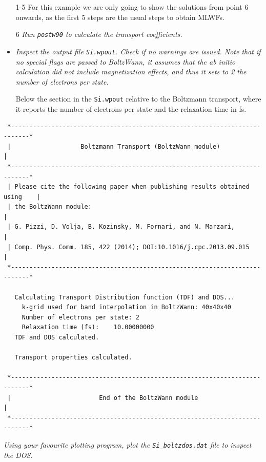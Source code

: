 \begin{itemize}
	\item[1-5] For this example we are only going to show the solutions from point 6 onwards, as the first 5 steps are the usual steps to obtain MLWFs.
	\item[6] {\it Run {\tt postw90} to calculate the transport coefficients.}
	\item {\it Inspect the output file {\tt Si.wpout}. Check if no warnings are issued. Note that if no special flags are passed to {\sc BoltzWann}, it assumes that the {\it ab initio} calculation did not include magnetization effects, and thus it sets to 2 the number of electrons per state.}

Below the section in the {\tt Si.wpout} relative to the Boltzmann transport, where it reports the number of electrons per state and the relaxation time in fs.
\end{itemize}
\begin{tcolorbox}[sharp corners,boxrule=0.5pt]
{\small
\begin{verbatim}
 *---------------------------------------------------------------------------*
 |                   Boltzmann Transport (BoltzWann module)                  |
 *---------------------------------------------------------------------------*
 | Please cite the following paper when publishing results obtained using    |
 | the BoltzWann module:                                                     |
 | G. Pizzi, D. Volja, B. Kozinsky, M. Fornari, and N. Marzari,              |
 | Comp. Phys. Comm. 185, 422 (2014); DOI:10.1016/j.cpc.2013.09.015          |
 *---------------------------------------------------------------------------*

   Calculating Transport Distribution function (TDF) and DOS...
     k-grid used for band interpolation in BoltzWann: 40x40x40
     Number of electrons per state: 2
     Relaxation time (fs):    10.00000000
   TDF and DOS calculated.

   Transport properties calculated.

 *---------------------------------------------------------------------------*
 |                        End of the BoltzWann module                        |
 *---------------------------------------------------------------------------*
\end{verbatim}
}
\end{tcolorbox}


{\it Using your favourite plotting program, plot the {\tt Si\_boltzdos.dat} file to inspect the DOS.}

